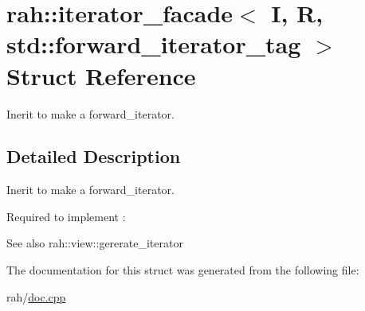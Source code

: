 \hypertarget{structrah_1_1iterator__facade_3_01_i_00_01_r_00_01std_1_1forward__iterator__tag_01_4}{}\section{rah\+::iterator\+\_\+facade$<$ I, R, std\+::forward\+\_\+iterator\+\_\+tag $>$ Struct Reference}
\label{structrah_1_1iterator__facade_3_01_i_00_01_r_00_01std_1_1forward__iterator__tag_01_4}


Inerit to make a forward\+\_\+iterator.  




\subsection{Detailed Description}
Inerit to make a forward\+\_\+iterator. 

Required to implement \+: 
\begin{DoxyCode}{0}
\end{DoxyCode}
 \begin{DoxySeeAlso}{See also}
rah\+::view\+::gererate\+\_\+iterator 
\end{DoxySeeAlso}


The documentation for this struct was generated from the following file\+:\begin{DoxyCompactItemize}
\item 
rah/\mbox{\hyperlink{doc_8cpp}{doc.\+cpp}}\end{DoxyCompactItemize}
